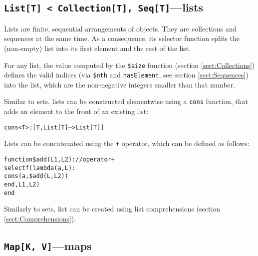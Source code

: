 

\subsection{{\tt List[T] < Collection[T],
    Seq[T]}---lists}\label{sect:Lists}



Lists are finite, sequential arrangements of objects. They are
collections and sequences at
the same time. As a consequence, its selector function splits the
(non-empty) list into its first element and the rest of the list.



For any list, the value computed by the {\tt \$size} function (section
\ref{sect:Collections}) defines the valid indices (via {\tt \$nth} and
{\tt hasElement}, see section \ref{sect:Sequences}) into the list, which
are the non-negative integers smaller than that number.


Similar to sets, lists can be
constructed elementwise using a {\tt cons} function, that adds an
element to the front of an existing list:
\begin{alltt}
  cons<T> : [T, List[T] --> List[T]]
\end{alltt}


Lists can be concatenated using the {\tt +} operator, which can be
defined as follows:
\begin{alltt}function \$add (L1, L2) : // operator +
    selectf(lambda (a, L) :
                cons(a, \$add(L, L2))
            end, L1, L2)
end
\end{alltt}

Similarly to sets, list can be created using list comprehensions
(section \ref{sect:Comprehensions}).



\subsection{{\tt Map[K, V]}---maps}\label{sect:Maps}

